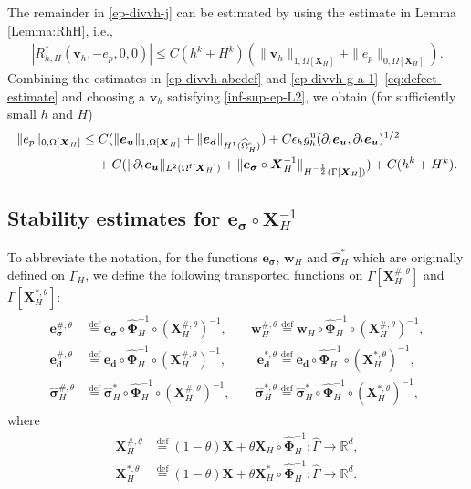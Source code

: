 \documentclass[11pt,reqno]{amsart}
\theoremstyle{definition}
\theoremstyle{plain}
\numberwithin{theorem}{section}
\numberwithin{proposition}{section}
\numberwithin{lemma}{section}
\numberwithin{equation}{section}
\newcommand{\bs}[1]{\boldsymbol{#1}}
\newcommand{\dep}{{{\bs{d}}}}
\renewcommand{\(}{\bigl(}
\renewcommand{\)}{\bigr)}
\newcommand{\MO}[1]{{\color{magenta} MO:  #1}}
\def\eqd{\stackrel{\mathrm{def}}{=}}
\begin{document}
The remainder in \eqref{ep-divvh-j} can be estimated by using the estimate in Lemma \ref{Lemma:RhH}, i.e., 
\begin{align}\label{eq:defect-estimate}
|R_{h,H}^*({\bs v}_h, -e_p, 0, 0)| \le C(h^k+H^k)( \|{\bs v}_h\|_{1,\Omega[{\bs X}_H]} + \|e_p\|_{0,\Omega[{\bs X}_H]}). 
\end{align}
Combining the estimates in \eqref{ep-divvh-abcdef} and \eqref{ep-divvh-g-a-1}--\eqref{eq:defect-estimate} and choosing a ${\bs v}_h$ satisfying \eqref{inf-sup-ep-L2}, we obtain (for sufficiently small $h$ and $H$)
\begin{align}\label{ep-L2}
\| e_p \|_{0,\Omega[{\bs X}_H]}
&\le C(\|{\bs e}_{\bs u}\|_{1,\Omega[\bs X_H]} + \|{\bs e}_\dep\|_{H^1(\widehat{\Omega}^{\rm s}_H)} ) 
+ C\epsilon_h
g_h^{\rm u}(\partial_t{\bs e}_{\bs u},\partial_t{\bs e}_{\bs u})^{1/2}\notag\\
&\quad\, +C(\|\partial_t {\bs e}_{\bs u}\|_{L^2(\Omega^{\rm f}[\bs X_H])} + \|{\bs e}_{\bs\sigma}\circ{\bs X}_H^{-1}\|_{H^{-\frac12}(\Gamma[{\bs X}_H])}) + C(h^k+H^k).
\end{align}


\subsection{Stability estimates for \texorpdfstring{${\bs e}_{\bs\sigma}\circ{\bs X}_H^{-1}$}{x}} \label{section:esigma}

To abbreviate the notation, for the functions ${\bs e}_{\bs\sigma}$, ${\bs w}_H$ and ${\widehat{\bs\sigma}}_H^{*}$ which are originally defined on $\widehat\Gamma_H$, we define the following transported functions on $\Gamma[{\bs X}_H^{\#,\theta}]$ and $\Gamma[{\bs X}_H^{*,\theta}]$:
\begin{align}\label{notation-sigma}
\begin{aligned}
{\bs e}_{\bs\sigma}^{\#,\theta} &\eqd {\bs e}_{\bs\sigma} \circ \widehat{\bs\Phi}_H^{-1} \circ({\bs X}_H^{\#,\theta})^{-1}, 
&&{\bs w}_H^{\#,\theta} \eqd {\bs w}_H\circ \widehat{\bs\Phi}_H^{-1} \circ({\bs X}_H^{\#,\theta})^{-1} ,\\ 
{\bs e}_{\bs d}^{\#,\theta} &\eqd {\bs e}_{\bs d}\circ \widehat{\bs\Phi}_H^{-1} \circ({\bs X}_H^{\#,\theta})^{-1},
&&\,\,\,{\bs e}_{\bs d}^{*,\theta} \eqd {\bs e}_{\bs d}\circ \widehat{\bs\Phi}_H^{-1} \circ({\bs X}_H^{*,\theta})^{-1} , \\
{\widehat{\bs\sigma}}_H^{\#,\theta} &\eqd {\widehat{\bs\sigma}}_H^{*}\circ \widehat{\bs\Phi}_H^{-1} \circ({\bs X}_H^{\#,\theta})^{-1} ,
&&\,\,{\widehat{\bs\sigma}}_H^{*,\theta} \eqd {\widehat{\bs\sigma}}_H^{*}\circ \widehat{\bs\Phi}_H^{-1} \circ({\bs X}_H^{*,\theta})^{-1} , 
\end{aligned}
\end{align}
where
\begin{align*}
{\bs X}_H^{\#,\theta}
&\eqd (1-\theta){\bs X} + \theta {\bs X}_H \circ \widehat{\bs\Phi}_H^{-1} : \widehat\Gamma \rightarrow \mathbb{R}^d ,\\
{\bs X}_H^{*,\theta} 
&\eqd (1-\theta) {\bs X} + \theta {\bs X}_H^*\circ \widehat{\bs\Phi}_H^{-1}:\widehat\Gamma\rightarrow \mathbb{R}^d .
\end{align*}
\end{document}
